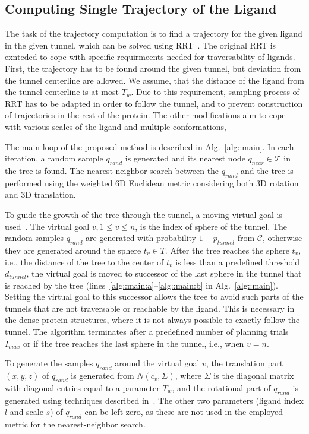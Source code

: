 \documentclass{svmult}
\def\qrand{q_{rand}}
\def\qnear{q_{near}}
\def\T{\mathcal{T}}
\def\C{\mathcal{C}}
\def\dt{d_{tunnel}}
\def\rv{T_w}
\def\Imax{I_{max}} %
\def\gb{p_{tunnel}}
\begin{document}
\subsection{Computing Single Trajectory of the Ligand}

The task of the trajectory computation is to find a trajectory for the given ligand in the given tunnel, which can be solved
using RRT~\cite{lavalleRRT}.
The original RRT is exnteded to cope with specific requirmeents needed for traversability of ligands.
First, the trajectory has to be found around the given tunnel, but deviation from the tunnel centerline are allowed.
We assume, that the distance of the ligand from the tunnel centerline is at most $\rv$.
Due to this requirement, sampling process of RRT has to be adapted in order to follow the tunnel, and to prevent
construction of trajectories in the rest of the protein.
The other modifications aim to cope with various scales of the ligand and multiple conformations,

The main loop of the proposed method is described in Alg.~\ref{alg::main}.
In each iteration, a random sample $\qrand$ is generated and its nearest node $\qnear\in\T$ in the tree is found.
The nearest-neighbor search between the $\qrand$ and the tree is performed using the weighted 6D Euclidean metric considering
both 3D rotation and 3D translation.

To guide the growth of the tree through the tunnel, a moving virtual goal is used~\cite{vonasek2009rrt}.
The virtual goal $v, 1\le v \le n$, is the index of sphere of the tunnel.
The random samples $\qrand$ are generated with probability $1-\gb$ from $\C$, otherwise they are generated around the sphere $t_v \in T$.
After the tree reaches the sphere $t_v$, i.e., the distance of the tree to the center of $t_v$ is
less than a predefined threshold $\dt$, the virtual goal is moved to successor of the last sphere in the tunnel
that is reached by the tree (lines~\ref{alg::main:a}--\ref{alg::main:b} in Alg.~\ref{alg::main}).
Setting the virtual goal to this successor allows the tree to avoid such parts of the tunnels that are not traversable or reachable by the ligand.
This is necessary in the dense protein structures, where it is not always possible to exactly follow the tunnel.
The algorithm terminates after a predefined number of planning trials $\Imax$ or if the tree reaches
the last sphere in the tunnel, i.e., when $v = n$.

To generate the samples $\qrand$ around the virtual goal $v$, the translation part $(x,y,z)$ of $\qrand$ is generated
from $N(c_v,\Sigma)$, where $\Sigma$ is the diagonal matrix with diagonal entries equal to a parameter $\rv$, and the rotational
part of $\qrand$ is generated using techniques described in~\cite{kuffnerES}.
The other two parameters (ligand index $l$ and scale $s$) of $\qrand$ can be left zero, as these are not used in the employed
metric for the nearest-neighbor search.
\end{document}
